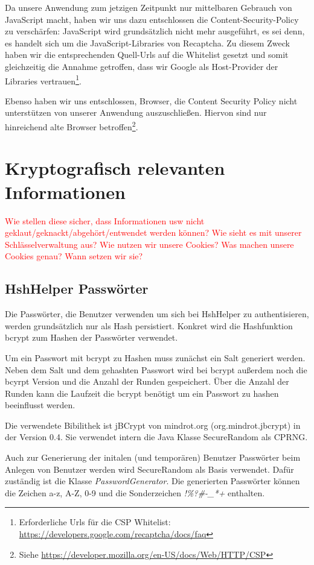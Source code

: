 \documentclass[12pt,DIV14,BCOR10mm,a4paper,parskip=half-,headsepline,headinclude,english,ngerman,bibliography=totocnumbered]{scrreprt}
\begin{document}
Da unsere Anwendung zum jetzigen Zeitpunkt nur mittelbaren Gebrauch von JavaScript macht, haben wir uns dazu entschlossen die Content-Security-Policy zu verschärfen: JavaScript wird grundsätzlich nicht mehr ausgeführt, es sei denn, es handelt sich um die JavaScript-Libraries von Recaptcha. Zu diesem Zweck haben wir die entsprechenden Quell-Urls auf die Whitelist gesetzt und somit gleichzeitig die Annahme getroffen, dass wir Google als Host-Provider der Libraries vertrauen\footnote{Erforderliche Urls für die CSP Whitelist: \url{https://developers.google.com/recaptcha/docs/faq}}.

Ebenso haben wir uns entschlossen, Browser, die Content Security Policy nicht unterstützen von unserer Anwendung auszuschließen. Hiervon sind nur hinreichend alte Browser betroffen\footnote{Siehe  \url{https://developer.mozilla.org/en-US/docs/Web/HTTP/CSP}}.

\section{Kryptografisch relevanten Informationen}

\textcolor{red}{
Wie stellen diese sicher, dass Informationen usw nicht geklaut/geknackt/abgehört/entwendet werden können?
Wie sieht es mit unserer Schlässelverwaltung aus?
Wie nutzen wir unsere Cookies? Was machen unsere Cookies genau?
Wann setzen wir sie?
}

\subsection{HshHelper Passwörter}
Die Passwörter, die Benutzer verwenden um sich bei HshHelper zu authentisieren, werden grundsätzlich nur als Hash persistiert. Konkret wird die Hashfunktion bcrypt zum Hashen der Passwörter verwendet.

Um ein Passwort mit bcrypt zu Hashen muss zunächst ein Salt generiert werden. Neben dem Salt und dem gehashten Passwort wird bei bcrypt außerdem noch die bcyrpt Version und die Anzahl der Runden gespeichert. Über die Anzahl der Runden kann die Laufzeit die bcrypt benötigt um ein Passwort zu hashen beeinflusst werden.

Die verwendete Bibilithek ist jBCrypt von mindrot.org (org.mindrot.jbcrypt) in der Version 0.4. Sie verwendet intern die Java Klasse SecureRandom als CPRNG.

Auch zur Generierung der initalen (und temporären) Benutzer Passwörter beim Anlegen von Benutzer werden wird SecureRandom als Basis verwendet. Dafür zuständig ist die Klasse \textit{PasswordGenerator}. Die generierten Passwörter können die Zeichen a-z, A-Z, 0-9 und die Sonderzeichen \textit{!\%?\#-\_*+} enthalten.
\end{document}
